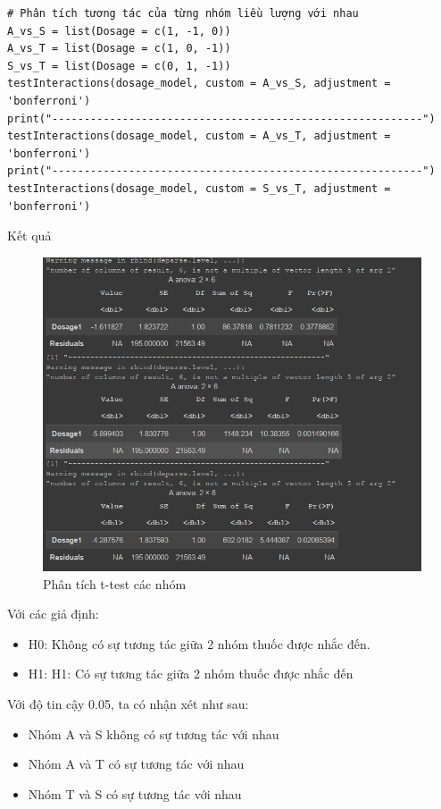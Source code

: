 \begin{itemize}
    \begin{lstlisting}
# Phân tích tương tác của từng nhóm liều lượng với nhau
A_vs_S = list(Dosage = c(1, -1, 0))
A_vs_T = list(Dosage = c(1, 0, -1))
S_vs_T = list(Dosage = c(0, 1, -1))
testInteractions(dosage_model, custom = A_vs_S, adjustment = 'bonferroni')
print("----------------------------------------------------------")
testInteractions(dosage_model, custom = A_vs_T, adjustment = 'bonferroni')
print("----------------------------------------------------------")
testInteractions(dosage_model, custom = S_vs_T, adjustment = 'bonferroni')
    \end{lstlisting}
Kết quả
\begin{figure}[H]
    \centering
    \includegraphics[width=0.8\linewidth]{part01_figures/16.png}
    \caption{Phân tích t-test các nhóm}
    \label{fig:Phân tích t-test các nhóm}
\end{figure}
Với các giả định:
    \begin{itemize}
        \item H0: Không có sự tương tác giữa 2 nhóm thuốc được nhắc đến.
        \item H1: H1: Có sự tương tác giữa 2 nhóm thuốc được nhắc đến
    \end{itemize}
    Với độ tin cậy 0.05, ta có nhận xét như sau:
    \begin{itemize}
        \item Nhóm A và S không có sự tương tác với nhau
        \item Nhóm A và T có sự tương tác với nhau
        \item Nhóm T và S có sự tương tác với nhau
    \end{itemize}


\end{itemize}

